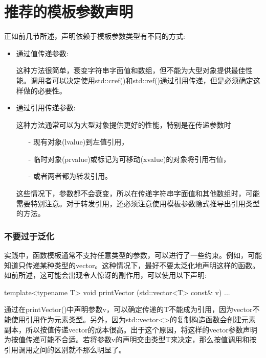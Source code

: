\section{推荐的模板参数声明}
正如前几节所述，声明依赖于模板参数类型有不同的方式:

\begin{itemize}
\item 
通过值传递参数:

这种方法很简单，衰变字符串字面值和数组，但不能为大型对象提供最佳性能。调用者可以决定使用std::cref()和std::ref()通过引用传递，但是必须确定这样做的必要性。

\item 
通过引用传递参数:

这种方法通常可以为大型对象提供更好的性能，特别是在传递参数时

\begin{itemize}
\item[-]
现有对象(lvalue)到左值引用，

\item[-]
临时对象(prvalue)或标记为可移动(xvalue)的对象将引用右值，

\item[-]
或者两者都为转发引用。
\end{itemize}

这些情况下，参数都不会衰变，所以在传递字符串字面值和其他数组时，可能需要特别注意。对于转发引用，还必须注意使用模板参数隐式推导出引用类型的方法。
\end{itemize}

\subsubsection{不要过于泛化}

实践中，函数模板通常不支持任意类型的参数，可以进行了一些约束。例如，可能知道只传递某种类型的vector。这种情况下，最好不要太泛化地声明这样的函数。如前所述，这可能会出现令人惊讶的副作用，可以使用以下声明:

\begin{cpp}
template<typename T>
void printVector (std::vector<T> const& v)
{
	...
}
\end{cpp}

通过在printVector()中声明参数v，可以确定传递的T不能成为引用，因为vector不能使用引用作为元素类型。另外，因为std::vector<>的复制构造函数会创建元素副本，所以按值传递vector的成本很高。出于这个原因，将这样的vector参数声明为按值传递可能不合适。若将参数v的声明交由类型T来决定，那么按值调用和按引用调用之间的区别就不那么明显了。

